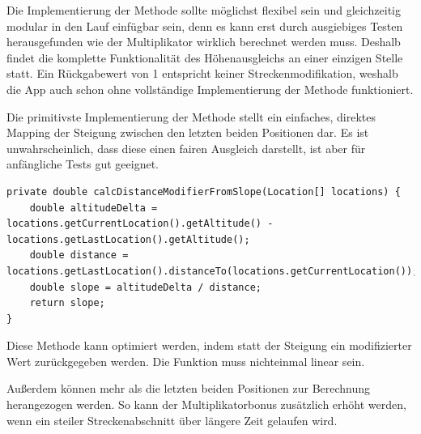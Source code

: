 Die Implementierung der Methode sollte möglichst flexibel sein und gleichzeitig modular in den Lauf einfügbar sein, denn es kann erst durch ausgiebiges Testen herausgefunden wie der Multiplikator wirklich berechnet werden muss. Deshalb findet die komplette Funktionalität des Höhenausgleichs an einer einzigen Stelle statt. Ein Rückgabewert von 1 entspricht keiner Streckenmodifikation, weshalb die App auch schon ohne vollständige Implementierung der Methode funktioniert.

Die primitivste Implementierung der Methode stellt ein einfaches, direktes Mapping der Steigung zwischen den letzten beiden Positionen dar. Es ist unwahrscheinlich, dass diese einen fairen Ausgleich darstellt, ist aber für anfängliche Tests gut geeignet.
\lstset{language=java}
\begin{lstlisting}[frame=htrbl, caption={Primitive Implementierung der Methode}, breaklines=true]
private double calcDistanceModifierFromSlope(Location[] locations) {
	double altitudeDelta = locations.getCurrentLocation().getAltitude() - locations.getLastLocation().getAltitude();
	double distance = locations.getLastLocation().distanceTo(locations.getCurrentLocation());
	double slope = altitudeDelta / distance;
	return slope;
}
\end{lstlisting}

Diese Methode kann optimiert werden, indem statt der Steigung ein modifizierter Wert zurückgegeben werden. Die Funktion muss nichteinmal linear sein.

Außerdem können mehr als die letzten beiden Positionen zur Berechnung herangezogen werden. So kann der Multiplikatorbonus zusätzlich erhöht werden, wenn ein steiler Streckenabschnitt über längere Zeit gelaufen wird.
